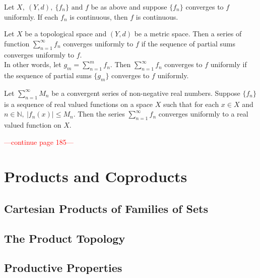 \begin{proposition}
	Let \( X,\ (Y,d),\ \{ f_n \} \text{ and } f \) be as above and suppose \( \{ f_n \} \) converges to \( f \) uniformly. If each \( f_n \) is continuous, then \( f \) is continuous.
\end{proposition}

\begin{definition}
	Let \( X \) be a topological space and \( (Y,d) \) be a metric space. Then a series of function \( \sum^\infty_{n = 1} f_n \) converges uniformly to \( f \) if the sequence of partial sums converges uniformly to \( f \).\\

	In other words, let \( g_m = \sum^m_{n = 1} f_n \). Then \( \sum^\infty_{n = 1} f_n \) converges to \( f \) uniformly if the sequence of partial sums \( \{ g_m \} \) converges to \( f \) uniformly.
\end{definition}

\begin{proposition}
	Let \( \sum^\infty_{n = 1} M_n \) be a convergent series of non-negative real numbers. Suppose \( \{ f_n \} \) is a sequence of real valued functions on a space \( X \) such that for each \( x \in X \) and \( n \in \mathbb{N},\ |f_n(x)| \le M_n \). Then the series \( \sum^\infty_{n = 1} f_n \) converges uniformly to a real valued function on \( X \).
\end{proposition}
\textcolor{red}{---continue page 185---}

\chapter{Products and Coproducts}
\section{Cartesian Products of Families of Sets}
\section{The Product Topology}
\section{Productive Properties}


